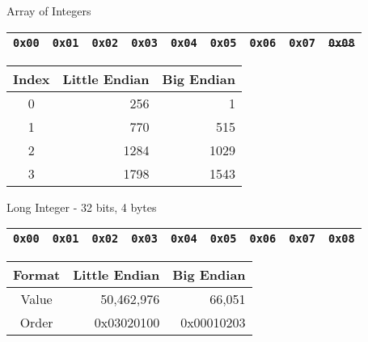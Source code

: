 \documentclass{beamer}
\begin{document}
\begin{frame}{Array of Integers}

\begin{table}[]
\begin{tabular}{|l|l|l|l|l|l|l|l|l|}
\hline
 \color{red}\texttt{0x00} & \color{red}\texttt{0x01} & \color{blue}\texttt{0x02} & \color{blue}\texttt{0x03} & \color{green}\texttt{0x04} & \color{green}\texttt{0x05} & \color{red}\texttt{0x06} & \color{red}\texttt{0x07} &
 \sout{\texttt{0x08}} \\
\hline 
\end{tabular}
\end{table}

\begin{table}[]
\begin{tabular}{c r r}
Index & Little Endian & Big Endian \\
\hline
 0 & 256 & 1 \\
 1 & 770 & 515 \\
 2 & 1284 & 1029 \\
 3 & 1798 & 1543
\end{tabular}
\end{table}

\end{frame}

\begin{frame}{Long Integer - 32 bits, 4 bytes}

\begin{table}[]
\begin{tabular}{|l|l|l|l|l|l|l|l|l|}
\hline
 \color{red}\texttt{0x00} & \color{red}\texttt{0x01} & \color{red}\texttt{0x02} & \color{red}\texttt{0x03} & \texttt{0x04} & \texttt{0x05} & \texttt{0x06} & \texttt{0x07} &
 \texttt{0x08} \\
\hline 
\end{tabular}
\end{table}

\begin{table}[]
\begin{tabular}{c r r}
Format & Little Endian & Big Endian \\
\hline
Value &  50,462,976   & 66,051 \\
Order & 0x03020100 & 0x00010203
\end{tabular}
\end{table}

\end{frame}
\end{document}
